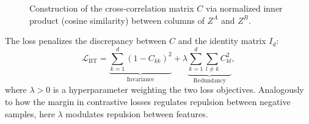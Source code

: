 \documentclass[11pt, oneside, openany]{book}
\begin{document}
\begin{figure}[H]
{
    }
    \caption{Construction of the cross-correlation matrix $C$ via normalized inner product (cosine similarity) between columns of $Z^A$ and $Z^B$.}
    \label{fig:5.3}
\end{figure}




\begin{definition}
\label{def:5.2}
The loss penalizes the discrepancy between $C$ and the identity matrix $I_{d}$:
\begin{equation}
\label{eq:5.20}
\mathcal{L}_{\text{BT}} = \underbrace{\sum_{k=1}^{d} (1 - C_{kk})^{2}}_{\text{Invariance}} + \lambda \underbrace{\sum_{k=1}^{d} \sum_{l \neq k} C_{kl}^{2}}_{\text{Redundancy}},
\end{equation}
where $\lambda > 0$ is a hyperparameter weighting the two loss objectives. Analogously to how the margin in contrastive losses regulates repulsion between negative samples, here $\lambda$ modulates repulsion between features.
\end{definition}
\end{document}

